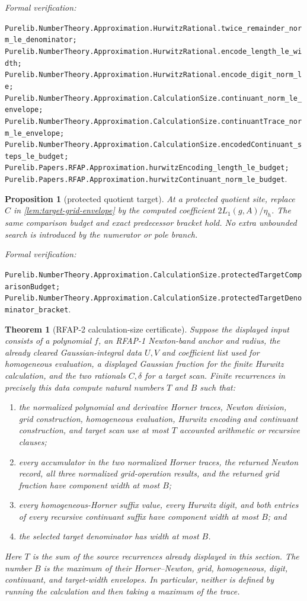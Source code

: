 \documentclass[11pt]{article}
\newtheorem{theorem}{Theorem}[section]
\newtheorem{proposition}[proposition]{Proposition}
\newcommand{\leanref}[1]{\par\smallskip\noindent
  \emph{Formal verification:}\par\nobreak
  {\raggedright\nolinkurl{#1}.\par}}
\begin{document}
\leanref{Purelib.NumberTheory.Approximation.HurwitzRational.twice_remainder_norm_le_denominator;
Purelib.NumberTheory.Approximation.HurwitzRational.encode_length_le_width;
Purelib.NumberTheory.Approximation.HurwitzRational.encode_digit_norm_le;
Purelib.NumberTheory.Approximation.CalculationSize.continuant_norm_le_envelope;
Purelib.NumberTheory.Approximation.CalculationSize.continuantTrace_norm_le_envelope;
Purelib.NumberTheory.Approximation.CalculationSize.encodedContinuant_steps_le_budget;
Purelib.Papers.RFAP.Approximation.hurwitzEncoding_length_le_budget;
Purelib.Papers.RFAP.Approximation.hurwitzContinuant_norm_le_budget}

\begin{proposition}[protected quotient target]
\label{prop:protected-target-envelope}
At a protected quotient site, replace $C$ in
\cref{lem:target-grid-envelope} by the computed coefficient
$2L_1(g,A)/\eta_h$.  The same comparison budget and exact predecessor bracket
hold.  No extra unbounded search is introduced by the numerator or pole
branch.
\end{proposition}

\leanref{Purelib.NumberTheory.Approximation.CalculationSize.protectedTargetComparisonBudget;
Purelib.NumberTheory.Approximation.CalculationSize.protectedTargetDenominator_bracket}

\begin{theorem}[RFAP-2 calculation-size certificate]
\label{thm:stage-two-resource-certificate}
Suppose the displayed input consists of a polynomial $f$, an RFAP-1
Newton-band anchor and radius, the already cleared Gaussian-integral data
$U,V$ and coefficient list used for homogeneous evaluation, a displayed
Gaussian fraction for the finite Hurwitz calculation, and the two rationals
$C,\delta$ for a target scan.  Finite recurrences in precisely this data
compute natural numbers $T$ and $B$ such that:
\begin{enumerate}
\item the normalized polynomial and derivative Horner traces, Newton
  division, grid construction, homogeneous evaluation, Hurwitz encoding and
  continuant construction, and target scan use at most $T$ accounted
  arithmetic or recursive clauses;
\item every accumulator in the two normalized Horner traces, the returned
  Newton record, all three normalized grid-operation results, and the returned
  grid fraction have component width at most $B$;
\item every homogeneous-Horner suffix value, every Hurwitz digit, and both
  entries of every recursive continuant suffix have component width at most
  $B$; and
\item the selected target denominator has width at most $B$.
\end{enumerate}
Here $T$ is the sum of the source recurrences already displayed in this
section.  The number $B$ is the maximum of their Horner--Newton, grid,
homogeneous, digit, continuant, and target-width envelopes.  In particular,
neither is defined by running the calculation and then taking a maximum of
the trace.
\end{theorem}
\end{document}
